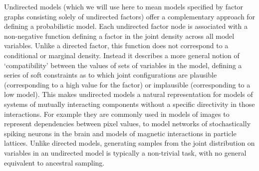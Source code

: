 Undirected models (which we will use here to mean models specified by factor graphs consisting solely of undirected factors) offer a complementary approach for defining a probabilistic model. Each undirected factor node is associated with a non-negative function defining a factor in the joint density across all model variables. Unlike a directed factor, this function does not correspond to a conditional or marginal density. Instead it describes a more general notion of `compatibility' between the values of sets of variables in the model, defining a series of soft constraints as to which joint configurations are plausible (corresponding to a high value for the factor) or implausible (corresponding to a low model). This makes undirected models a natural representation for models of systems of mutually interacting components without a specific directivity in those interactions. For example they are commonly used in models of images to represent dependencies between pixel values, to model networks of stochastically spiking neurons in the brain and models of magnetic interactions in particle lattices. Unlike directed models, generating samples from the joint distribution on variables in an undirected model is typically a non-trivial task, with no general equivalent to ancestral sampling. %

